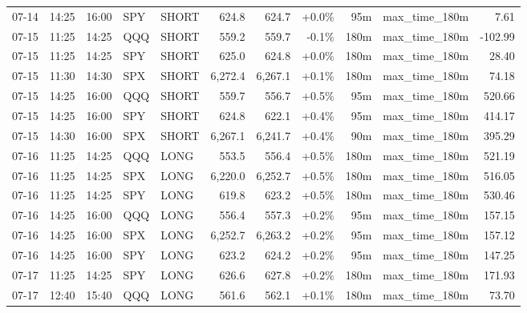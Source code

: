 \documentclass[11pt,a4paper,twoside]{article}
\begin{document}
\begin{center}
\begin{longtable}{>{\color{txtmain}}l l l l l r r r r >{\color{txtmain}}l r}
07-14 & 14:25 & 16:00 & SPY & SHORT & 624.8 & 624.7 & \textcolor{wingreen}{+0.0\%} & 95m & max\_time\_180m & \textcolor{wingreen}{7.61} \\
07-15 & 11:25 & 14:25 & QQQ & SHORT & 559.2 & 559.7 & \textcolor{lossred}{-0.1\%} & 180m & max\_time\_180m & \textcolor{lossred}{-102.99} \\
07-15 & 11:25 & 14:25 & SPY & SHORT & 625.0 & 624.8 & \textcolor{wingreen}{+0.0\%} & 180m & max\_time\_180m & \textcolor{wingreen}{28.40} \\
07-15 & 11:30 & 14:30 & SPX & SHORT & 6,272.4 & 6,267.1 & \textcolor{wingreen}{+0.1\%} & 180m & max\_time\_180m & \textcolor{wingreen}{74.18} \\
07-15 & 14:25 & 16:00 & QQQ & SHORT & 559.7 & 556.7 & \textcolor{wingreen}{+0.5\%} & 95m & max\_time\_180m & \textcolor{wingreen}{520.66} \\
07-15 & 14:25 & 16:00 & SPY & SHORT & 624.8 & 622.1 & \textcolor{wingreen}{+0.4\%} & 95m & max\_time\_180m & \textcolor{wingreen}{414.17} \\
07-15 & 14:30 & 16:00 & SPX & SHORT & 6,267.1 & 6,241.7 & \textcolor{wingreen}{+0.4\%} & 90m & max\_time\_180m & \textcolor{wingreen}{395.29} \\
07-16 & 11:25 & 14:25 & QQQ & LONG & 553.5 & 556.4 & \textcolor{wingreen}{+0.5\%} & 180m & max\_time\_180m & \textcolor{wingreen}{521.19} \\
07-16 & 11:25 & 14:25 & SPX & LONG & 6,220.0 & 6,252.7 & \textcolor{wingreen}{+0.5\%} & 180m & max\_time\_180m & \textcolor{wingreen}{516.05} \\
07-16 & 11:25 & 14:25 & SPY & LONG & 619.8 & 623.2 & \textcolor{wingreen}{+0.5\%} & 180m & max\_time\_180m & \textcolor{wingreen}{530.46} \\
07-16 & 14:25 & 16:00 & QQQ & LONG & 556.4 & 557.3 & \textcolor{wingreen}{+0.2\%} & 95m & max\_time\_180m & \textcolor{wingreen}{157.15} \\
07-16 & 14:25 & 16:00 & SPX & LONG & 6,252.7 & 6,263.2 & \textcolor{wingreen}{+0.2\%} & 95m & max\_time\_180m & \textcolor{wingreen}{157.12} \\
07-16 & 14:25 & 16:00 & SPY & LONG & 623.2 & 624.2 & \textcolor{wingreen}{+0.2\%} & 95m & max\_time\_180m & \textcolor{wingreen}{147.25} \\
07-17 & 11:25 & 14:25 & SPY & LONG & 626.6 & 627.8 & \textcolor{wingreen}{+0.2\%} & 180m & max\_time\_180m & \textcolor{wingreen}{171.93} \\
07-17 & 12:40 & 15:40 & QQQ & LONG & 561.6 & 562.1 & \textcolor{wingreen}{+0.1\%} & 180m & max\_time\_180m & \textcolor{wingreen}{73.70} \\

\end{longtable}
\end{center}
\end{document}
